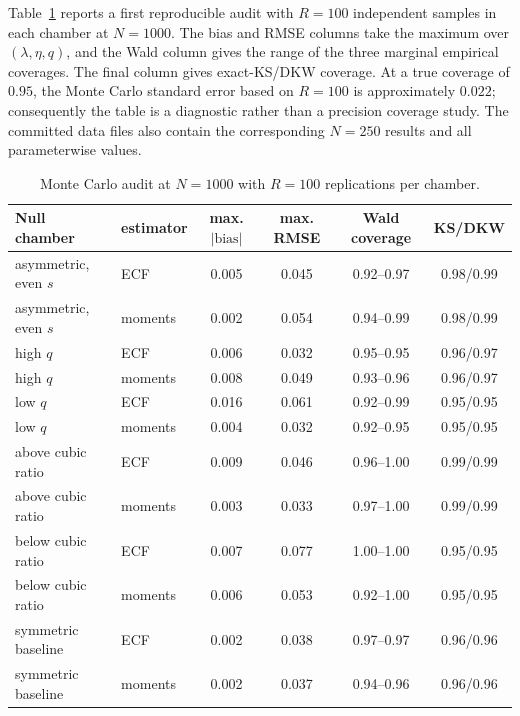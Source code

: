 \documentclass[11pt]{amsart}
\numberwithin{equation}{section}\setcounter{tocdepth}{3}\setcounter{secnumdepth}{3}
\begin{document}
Table~\ref{tab:inference_monte_carlo} reports a first reproducible audit with $R=100$
independent samples in each chamber at $N=1000$.  The bias and RMSE columns take the
maximum over $(\lambda,\eta,q)$, and the Wald column gives the range of the three
marginal empirical coverages.  The final column gives exact-KS/DKW coverage.  At a true
coverage of $0.95$, the Monte Carlo standard error based on $R=100$ is approximately
$0.022$; consequently the table is a diagnostic rather than a precision coverage study.
The committed data files also contain the corresponding $N=250$ results and all
parameterwise values.
\begin{table}[htbp]
\centering\small
\caption{Monte Carlo audit at $N=1000$ with $R=100$ replications per chamber.}
\label{tab:inference_monte_carlo}
\begin{tabular}{llcccc}
\toprule
Null chamber & estimator & max. $|\mathrm{bias}|$ & max. RMSE & Wald coverage & KS/DKW \\
\midrule
asymmetric, even $s$ & ECF & 0.005 & 0.045 & 0.92--0.97 & 0.98/0.99 \\
asymmetric, even $s$ & moments & 0.002 & 0.054 & 0.94--0.99 & 0.98/0.99 \\
high $q$ & ECF & 0.006 & 0.032 & 0.95--0.95 & 0.96/0.97 \\
high $q$ & moments & 0.008 & 0.049 & 0.93--0.96 & 0.96/0.97 \\
low $q$ & ECF & 0.016 & 0.061 & 0.92--0.99 & 0.95/0.95 \\
low $q$ & moments & 0.004 & 0.032 & 0.92--0.95 & 0.95/0.95 \\
above cubic ratio & ECF & 0.009 & 0.046 & 0.96--1.00 & 0.99/0.99 \\
above cubic ratio & moments & 0.003 & 0.033 & 0.97--1.00 & 0.99/0.99 \\
below cubic ratio & ECF & 0.007 & 0.077 & 1.00--1.00 & 0.95/0.95 \\
below cubic ratio & moments & 0.006 & 0.053 & 0.92--1.00 & 0.95/0.95 \\
symmetric baseline & ECF & 0.002 & 0.038 & 0.97--0.97 & 0.96/0.96 \\
symmetric baseline & moments & 0.002 & 0.037 & 0.94--0.96 & 0.96/0.96 \\
\bottomrule
\end{tabular}
\end{table}
\end{document}
